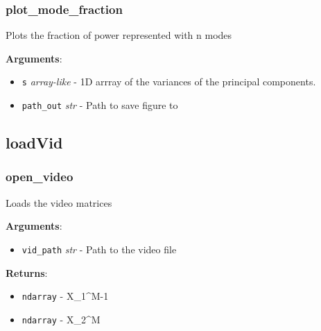 \subsubsection{plot\_mode\_fraction}

\begin{Shaded}
\begin{Highlighting}[]
\end{Highlighting}
\end{Shaded}

Plots the fraction of power represented with n modes

\textbf{Arguments}:

\begin{itemize}
\tightlist
\item
  \texttt{s} \emph{array-like} - 1D arrray of the variances of the
  principal components.
\item
  \texttt{path\_out} \emph{str} - Path to save figure to
\end{itemize}

\subsection{loadVid}

\subsubsection{open\_video}

\begin{Shaded}
\begin{Highlighting}[]
\end{Highlighting}
\end{Shaded}

Loads the video matrices

\textbf{Arguments}:

\begin{itemize}
\tightlist
\item
  \texttt{vid\_path} \emph{str} - Path to the video file
\end{itemize}

\textbf{Returns}:

\begin{itemize}
\tightlist
\item
  \texttt{ndarray} - X\_1\^{}M-1
\item
  \texttt{ndarray} - X\_2\^{}M
\end{itemize}
